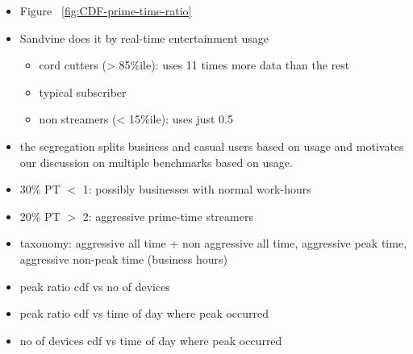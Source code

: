 \begin{itemize}
\itemsep0em
\item Figure ~\ref{fig:CDF-prime-time-ratio}
\item Sandvine does it by real-time entertainment usage
\begin{itemize}
\item  cord cutters (> 85\%ile): uses 11 times more data than the rest
\item typical subscriber
\item non streamers (< 15\%ile): uses just 0.5%
\end{itemize}
\item the segregation splits business and casual users based on usage and motivates our discussion on multiple benchmarks based on usage.
\item 30\% PT $<$ 1: possibly businesses with normal work-hours
\item 20\% PT $>$ 2: aggressive prime-time streamers
\item taxonomy: aggressive all time + non aggressive all time, aggressive peak time, aggressive non-peak time (business hours)

\end{itemize}




\begin{itemize}
\itemsep0em
\item peak ratio cdf vs no of devices
\item peak ratio cdf vs time of day where peak occurred
\item no of devices cdf vs time of day where peak occurred
\end{itemize}
